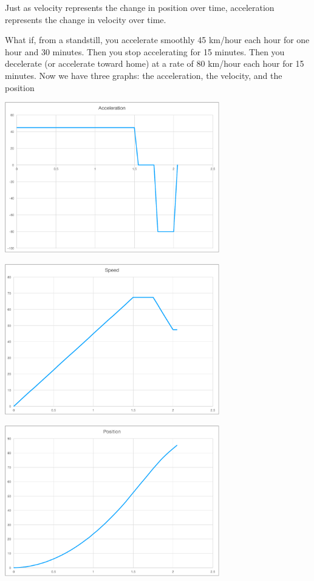 Just as velocity represents the change in position over time,
acceleration represents the change in velocity over time.

What if, from a standstill, you accelerate smoothly 45 km/hour each
hour for one hour and 30 minutes. Then you stop accelerating for 15
minutes. Then you decelerate (or accelerate toward home) at a rate of
80 km/hour each hour for 15 minutes. Now we have three graphs: the
acceleration, the velocity, and the position

\includegraphics[width=0.7\textwidth]{acceleration_asp.pdf}

\includegraphics[width=0.7\textwidth]{speed_asp.pdf}

\includegraphics[width=0.7\textwidth]{position_asp.pdf}


